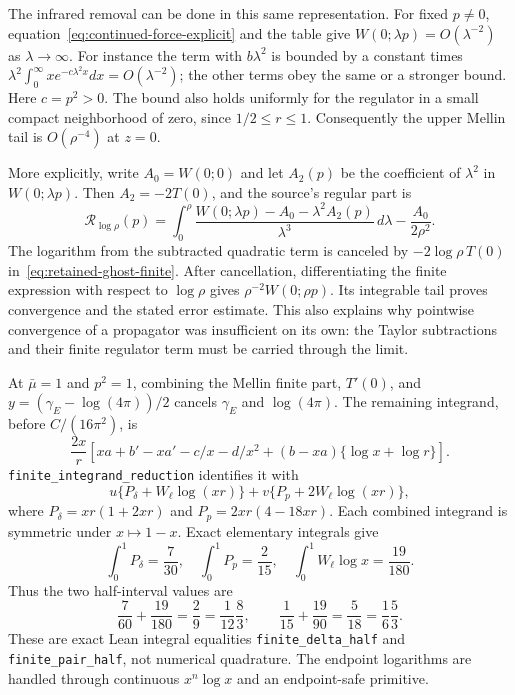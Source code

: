 \documentclass[11pt]{article}
\newcommand{\code}[1]{{\small\nolinkurl{#1}}}
\begin{document}
The infrared removal can be done in this same representation.
For fixed $p\ne0$, equation~\eqref{eq:continued-force-explicit}
and the table give $W(0;\lambda p)=O(\lambda^{-2})$ as
$\lambda\to\infty$. For instance the term with $b\lambda^2$
is bounded by a constant times
$\lambda^2\int_0^\infty x e^{-c\lambda^2x}dx=O(\lambda^{-2})$;
the other terms obey the same or a stronger bound. Here $c=p^2>0$.
The bound also holds uniformly for the regulator in a small compact
neighborhood of zero, since $1/2\le r\le1$.
Consequently the upper Mellin tail is $O(\rho^{-4})$ at $z=0$.

More explicitly, write $A_0=W(0;0)$ and let $A_2(p)$ be the
coefficient of $\lambda^2$ in $W(0;\lambda p)$. Then
$A_2=-2T(0)$, and the source's regular part is
\[
 \mathcal R_{\log\rho}(p)=
  \int_0^\rho\!\frac{W(0;\lambda p)-A_0-\lambda^2A_2(p)}{\lambda^3}
          \,d\lambda-\frac{A_0}{2\rho^2}.
\]
The logarithm from the subtracted quadratic term is canceled by
$-2\log\rho\,T(0)$ in~\eqref{eq:retained-ghost-finite}.
After cancellation, differentiating the finite expression with
respect to $\log\rho$ gives $\rho^{-2}W(0;\rho p)$.
Its integrable tail proves convergence and the stated error estimate.
This also explains why pointwise convergence of a propagator was
insufficient on its own: the Taylor subtractions and their finite
regulator term must be carried through the limit.

At $\bar\mu=1$ and $p^2=1$, combining the Mellin finite part,
$T'(0)$, and $y=(\gamma_E-\log(4\pi))/2$ cancels $\gamma_E$
and $\log(4\pi)$. The remaining integrand, before $C/(16\pi^2)$,
is
\[
 \frac{2x}{r}\left[xa+b'-xa'-c/x-d/x^2
                       +(b-xa)\{\log x+\log r\}\right].
\]
\code{finite_integrand_reduction} identifies it with
\[
 u\{P_\delta+W_\ell\log(xr)\}
   +v\{P_p+2W_\ell\log(xr)\},
\]
where $P_\delta=xr(1+2xr)$ and $P_p=2xr(4-18xr)$.
Each combined integrand is symmetric under $x\mapsto1-x$.
Exact elementary integrals give
\[
 \int_0^1P_\delta=\frac7{30},\quad
 \int_0^1P_p=\frac2{15},\quad
 \int_0^1W_\ell\log x=\frac{19}{180}.
\]
Thus the two half-interval values are
\begin{equation}\label{eq:finite-ghost-constants}
 \frac7{60}+\frac{19}{180}=\frac29
       =\frac1{12}\frac83,\qquad
 \frac1{15}+\frac{19}{90}=\frac5{18}
       =\frac16\frac53.
\end{equation}
These are exact Lean integral equalities
\code{finite_delta_half} and \code{finite_pair_half}, not numerical
quadrature. The endpoint logarithms are handled through continuous
$x^n\log x$ and an endpoint-safe primitive.
\end{document}
